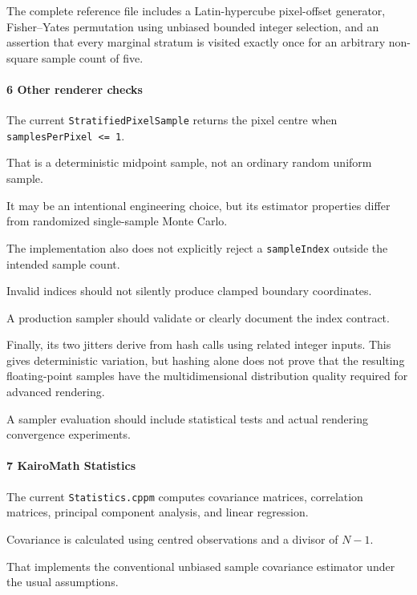 The complete reference file includes a Latin-hypercube pixel-offset generator, Fisher--Yates permutation using unbiased bounded integer selection, and an assertion that every marginal stratum is visited exactly once for an arbitrary non-square sample count of five.

\paragraph{6 Other renderer checks}\label{02-foundations-ii-ch039-other-renderer-checks}

The current \texttt{StratifiedPixelSample} returns the pixel centre when \texttt{samplesPerPixel\ \textless{}=\ 1}.

That is a deterministic midpoint sample, not an ordinary random uniform sample.

It may be an intentional engineering choice, but its estimator properties differ from randomized single-sample Monte Carlo.

The implementation also does not explicitly reject a \texttt{sampleIndex} outside the intended sample count.

Invalid indices should not silently produce clamped boundary coordinates.

A production sampler should validate or clearly document the index contract.

Finally, its two jitters derive from hash calls using related integer inputs. This gives deterministic variation, but hashing alone does not prove that the resulting floating-point samples have the multidimensional distribution quality required for advanced rendering.

A sampler evaluation should include statistical tests and actual rendering convergence experiments.

\paragraph{7 KairoMath Statistics}\label{02-foundations-ii-ch039-kairomath-statistics}

The current \texttt{Statistics.cppm} computes covariance matrices, correlation matrices, principal component analysis, and linear regression.

Covariance is calculated using centred observations and a divisor of \(N-1\).

That implements the conventional unbiased sample covariance estimator under the usual assumptions.

